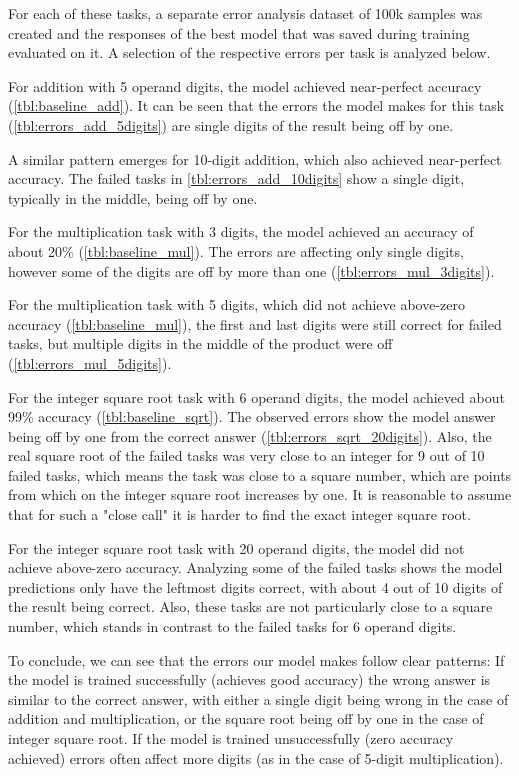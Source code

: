 For each of these tasks, a separate error analysis dataset of 100k samples was created and the responses of the best model that was saved during training evaluated on it. A selection of the respective errors per task is analyzed below.

For addition with 5 operand digits, the model achieved near-perfect accuracy (\cref{tbl:baseline_add}).
It can be seen that the errors the model makes for this task (\cref{tbl:errors_add_5digits}) are single digits of the result being off by one.


A similar pattern emerges for 10-digit addition, which also achieved near-perfect accuracy. The failed tasks in \cref{tbl:errors_add_10digits} show a single digit, typically in the middle, being off by one. 


For the multiplication task with 3 digits, the model achieved an accuracy of about 20\% (\cref{tbl:baseline_mul}). The errors are affecting only single digits, however some of the digits are off by more than one (\cref{tbl:errors_mul_3digits}).


For the multiplication task with 5 digits, which did not achieve above-zero accuracy (\cref{tbl:baseline_mul}), the first and last digits were still correct for failed tasks, but multiple digits in the middle of the product were off (\cref{tbl:errors_mul_5digits}).


For the integer square root task with 6 operand digits, the model achieved about 99\% accuracy (\cref{tbl:baseline_sqrt}). The observed errors show the model answer being off by one from the correct answer (\cref{tbl:errors_sqrt_20digits}). Also, the real square root of the failed tasks was very close to an integer for 9 out of 10 failed tasks, which means the task was close to a square number, which are points from which on the integer square root increases by one. It is reasonable to assume that for such a "close call" it is harder to find the exact integer square root.

For the integer square root task with 20 operand digits, the model did not achieve above-zero accuracy. Analyzing some of the failed tasks shows the model predictions only have the leftmost digits correct, with about 4 out of 10 digits of the result being correct. Also, these tasks are not particularly close to a square number, which stands in contrast to the failed tasks for 6 operand digits.

To conclude, we can see that the errors our model makes follow clear patterns: If the model is trained successfully (achieves good accuracy) the wrong answer is similar to the correct answer, with either a single digit being wrong in the case of addition and multiplication, or the square root being off by one in the case of integer square root. If the model is trained unsuccessfully (zero accuracy achieved) errors often affect more digits (as in the case of 5-digit multiplication).




